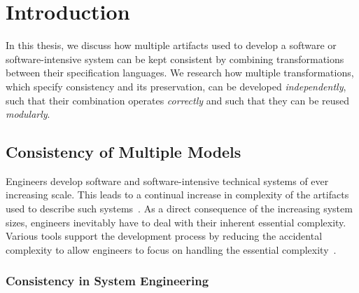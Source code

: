 \chapter{Introduction
}
\label{chap:introduction}

In this thesis, we discuss how multiple artifacts used to develop a software or software-intensive system can be kept consistent by combining transformations between their specification languages.
We research how multiple transformations, which specify consistency and its preservation, can be developed \emph{independently}, such that their combination operates \emph{correctly} and such that they can be reused \emph{modularly}.


\section{Consistency of Multiple Models}

Engineers develop software and software-intensive technical systems of ever increasing scale.
This leads to a continual increase in complexity of the artifacts used to describe such systems~\cite{murer2011evolution}.
As a direct consequence of the increasing system sizes, engineers inevitably have to deal with their inherent essential complexity.
Various tools support the development process by reducing the accidental complexity to allow engineers to focus on handling the essential complexity~\cite{brooks1987NoSilverBullet-Computer, fraser2008NoSilverBulletReloaded-Software}.

\subsection{Consistency in System Engineering}

